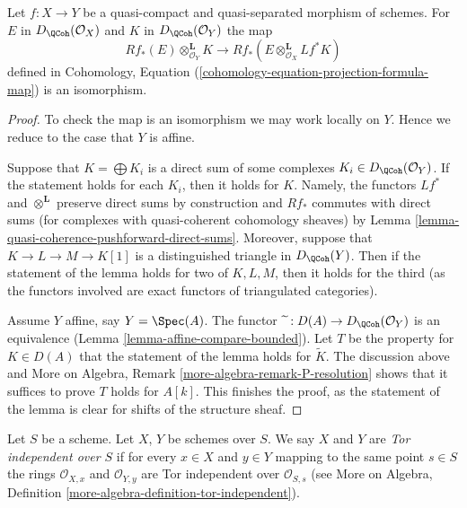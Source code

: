 \begin{lemma}
\label{lemma-cohomology-base-change}
Let $f : X \to Y$ be a quasi-compact and quasi-separated morphism
of schemes. For $E$ in $D_\QCoh(\mathcal{O}_X)$ and
$K$ in $D_\QCoh(\mathcal{O}_Y)$ the map
$$
Rf_*(E) \otimes_{\mathcal{O}_Y}^\mathbf{L} K
\longrightarrow
Rf_*(E \otimes_{\mathcal{O}_X}^\mathbf{L} Lf^*K)
$$
defined in
Cohomology, Equation (\ref{cohomology-equation-projection-formula-map})
is an isomorphism.
\end{lemma}

\begin{proof}
To check the map is an isomorphism we may work locally on $Y$.
Hence we reduce to the case that $Y$ is affine.

\medskip\noindent
Suppose that $K = \bigoplus K_i$ is a direct
sum of some complexes $K_i \in D_\QCoh(\mathcal{O}_Y)$.
If the statement holds for each $K_i$, then it holds for $K$.
Namely, the functors $Lf^*$ and $\otimes^\mathbf{L}$ preserve
direct sums by construction and $Rf_*$ commutes with direct sums
(for complexes with quasi-coherent cohomology sheaves) by
Lemma \ref{lemma-quasi-coherence-pushforward-direct-sums}.
Moreover, suppose that $K \to L \to M \to K[1]$ is a distinguished
triangle in $D_\QCoh(Y)$. Then if the statement of the
lemma holds for two of $K, L, M$, then it holds for the third
(as the functors involved are exact functors of triangulated categories).

\medskip\noindent
Assume $Y$ affine, say $Y = \Spec(A)$. The functor
$\widetilde{\ } : D(A) \to D_\QCoh(\mathcal{O}_Y)$ is an equivalence
(Lemma \ref{lemma-affine-compare-bounded}).
Let $T$ be the property for $K \in D(A)$ that
the statement of the lemma holds for $\widetilde{K}$.
The discussion above and
More on Algebra, Remark \ref{more-algebra-remark-P-resolution}
shows that it suffices to prove $T$ holds for $A[k]$.
This finishes the proof, as the statement of the lemma
is clear for shifts of the structure sheaf.
\end{proof}

\begin{definition}
\label{definition-tor-independent}
Let $S$ be a scheme. Let $X$, $Y$ be schemes over $S$. We say $X$ and
$Y$ are {\it Tor independent over $S$} if for every $x \in X$ and
$y \in Y$ mapping to the same point $s \in S$ the rings
$\mathcal{O}_{X, x}$ and $\mathcal{O}_{Y, y}$ are Tor independent
over $\mathcal{O}_{S, s}$ (see
More on Algebra, Definition \ref{more-algebra-definition-tor-independent}).
\end{definition}

